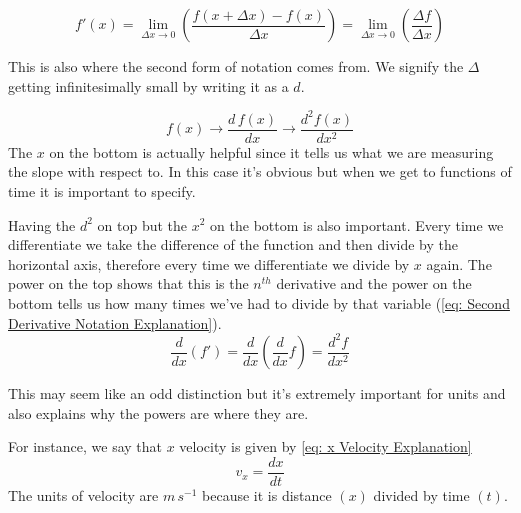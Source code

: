 \documentclass[main.tex]{subfiles}
\begin{document}
            \begin{equation}
                f'(x) = \lim_{\Delta x \to 0} \left(\frac{f(x+\Delta x) - f(x)}{\Delta x}\right) = \lim_{\Delta x \to 0} \left(\frac{\Delta f}{\Delta x}\right)
                \label{eq: Definition of Derivative}
            \end{equation}

            This is also where the second form of notation comes from. We signify the $\Delta$ getting infinitesimally small by writing it as a $d$.

            \begin{equation*}
                f(x) \to \frac{d\, f(x)}{dx} \to \frac{d^2 f(x)}{dx^2}
            \end{equation*}
            The $x$ on the bottom is actually helpful since it tells us what we are measuring the slope with respect to. In this case it's obvious but when we get to functions of time it is important to specify.

            Having the $d^2$ on top but the $x^2$ on the bottom is also important. Every time we differentiate we take the difference of the function and then divide by the horizontal axis, therefore every time we differentiate we divide by $x$ again. The power on the top shows that this is the $n^{th}$ derivative and the power on the bottom tells us how many times we've had to divide by that variable (\eqref{eq: Second Derivative Notation Explanation}).
            \begin{equation}
                \frac{d}{dx}(f') = \frac{d}{dx}\left(\frac{d}{dx}f\right) = \frac{d^2 f}{dx^2}
                \label{eq: Second Derivative Notation Explanation}
            \end{equation}

            This may seem like an odd distinction but it's extremely important for units and also explains why the powers are where they are.

            For instance, we say that $x$ velocity is given by \eqref{eq: x Velocity Explanation}
            \begin{equation}
                v_x = \frac{dx}{dt}
                \label{eq: x Velocity Explanation}
            \end{equation}
            The units of velocity are $m\,s^{-1}$ because it is distance $(x)$ divided by time $(t)$.

            \vfill
\end{document}
